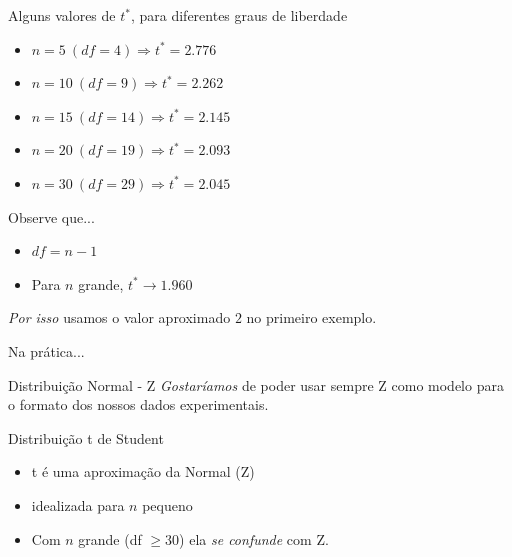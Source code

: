\documentclass{beamer}
\begin{document}
\begin{frame}{\scriptsize Alguns valores de $t^{*}$, para diferentes graus de liberdade}
  \begin{itemize}
    \footnotesize
  \item $n = 5\ (df = 4) \Rightarrow t^{*} = 2.776$
  \item $n = 10\ (df = 9) \Rightarrow t^{*} = 2.262$
  \item $n = 15\ (df = 14) \Rightarrow t^{*} = 2.145$
  \item $n = 20\ (df = 19) \Rightarrow t^{*} = 2.093$
  \item $n = 30\ (df = 29) \Rightarrow t^{*} = 2.045$
  \end{itemize}
  \begin{block}{Observe que...}
    \footnotesize
    \begin{itemize}
      \scriptsize
    \item $df = n - 1$
    \item Para $n$ grande, $t^{*} \rightarrow 1.960$
    \end{itemize}
    \bigskip
    \scriptsize
    {\em Por isso} usamos o valor aproximado $2$ no primeiro exemplo.
  \end{block}
\end{frame}

\begin{frame}{\scriptsize Na prática...}
  \begin{block}{Distribuição Normal - Z}
    \footnotesize
    {\em Gostaríamos} de poder usar sempre Z como \alert{modelo} para o formato dos nossos dados experimentais.
  \end{block}
  \begin{block}{Distribuição t de Student}
    \begin{itemize}
      \footnotesize
    \item t é uma aproximação da Normal (Z)
      \medskip
    \item idealizada para $n$ pequeno
      \medskip
    \item Com $n$ grande (df $\ge 30$) ela {\em se confunde} com Z.
    \end{itemize}
  \end{block}
\end{frame}
\end{document}

